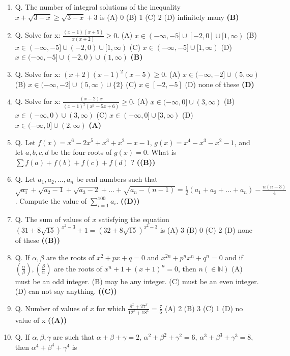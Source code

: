 \documentclass{article}
\begin{document}
\begin{enumerate}
(A) $\frac{1}{2}$
(B) $\frac{3}{2}$
(C) $\frac{5}{2}$
(D) 2 \hfill \textbf{(B)}
\item Q. The number of integral solutions of the inequality
$x + \sqrt{3 - x} \geq \sqrt{3 - x} + 3$
is
(A) 0
(B) 1
(C) 2
(D) infinitely many \hfill \textbf{(B)}
\item Q. Solve for x:
$\frac{(x - 1)(x + 5)}{x(x + 2)} \geq 0$.
(A) $x \in (-\infty, -5] \cup [-2, 0] \cup [1, \infty)$
(B) $x \in (-\infty, -5] \cup (-2, 0) \cup [1, \infty)$
(C) $x \in (-\infty, -5] \cup [1, \infty)$
(D) $x \in (-\infty, -5] \cup (-2, 0) \cup (1, \infty)$ \hfill \textbf{(B)}
\item Q. Solve for x:
$(x + 2) (x - 1)^2 (x - 5) \geq 0$.
(A) $x \in (-\infty, -2] \cup (5, \infty)$
(B) $x \in (-\infty, -2] \cup (5, \infty) \cup \{2\}$
(C) $x \in [-2, -5]$
(D) none of these \hfill \textbf{(D)}
\item Q. Solve for x:
$\frac{(x - 2) x}{(x - 1)^2 (x^2 - 5x + 6)} \geq 0$.
(A) $x \in (-\infty, 0] \cup (3, \infty)$
(B) $x \in (-\infty, 0) \cup (3, \infty)$
(C) $x \in (-\infty, 0] \cup [3, \infty)$
(D) $x \in (-\infty, 0] \cup (2, \infty)$ \hfill \textbf{(A)}
\item Q. Let
$f(x) = x^6 - 2x^5 + x^3 + x^2 - x - 1$, $g(x) = x^4 - x^3 - x^2 - 1$,
and let $a, b, c, d$ be the four roots of $g(x) = 0$. What is
$\sum f(a) + f(b) + f(c) + f(d)$ ? \hfill \textbf{((B))}
\item Q. Let $a_1, a_2, \dots, a_n$ be real numbers such that $\sqrt{a_1} + \sqrt{a_2-1} + \sqrt{a_3 - 2} + \dots + \sqrt{a_n - (n - 1)} = \frac{1}{2}(a_1 + a_2 + \dots + a_n) - \frac{n(n-3)}{4}$. Compute the value of $\sum_{i=1}^{100} a_i$. \hfill \textbf{((D))}
\item Q. The sum of values of $x$ satisfying the equation $(31 + 8\sqrt{15})^{x^2-3} + 1 = (32 + 8\sqrt{15})^{x^2-3}$ is
(A) 3
(B) 0
(C) 2
(D) none of these \hfill \textbf{((B))}
\item Q. If $\alpha, \beta$ are the roots of $x^2 + px + q = 0$ and $x^{2n} + p^n x^n + q^n = 0$ and if $\left(\frac{\alpha}{\beta}\right), \left(\frac{\beta}{\alpha}\right)$ are the roots of $x^n + 1 + (x + 1)^n = 0$, then $n(\in \mathbb{N})$
(A) must be an odd integer.
(B) may be any integer.
(C) must be an even integer.
(D) can not say anything. \hfill \textbf{((C))}
\item Q. Number of values of $x$ for which $\frac{8^x+27^x}{12^x+18^x} = \frac{7}{6}$
(A) 2
(B) 3
(C) 1
(D) no value of x \hfill \textbf{((A))}
\item Q. If $\alpha, \beta, \gamma$ are such that $\alpha+ \beta + \gamma = 2$, $\alpha^2 + \beta^2 + \gamma^2 = 6$, $\alpha^3 + \beta^3 + \gamma^3 = 8$, then $\alpha^4 + \beta^4 + \gamma^4$ is

\end{enumerate}
\end{document}
